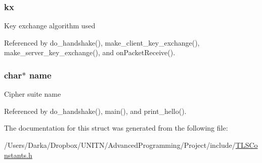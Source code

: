 \subsubsection[{\texorpdfstring{kx}{kx}}]{ kx}\hypertarget{structcipher__suite__t_ad84bfc73673c813712dbbc08d89c53a9}{}\label{structcipher__suite__t_ad84bfc73673c813712dbbc08d89c53a9}
Key exchange algorithm used 

Referenced by do\+\_\+handshake(), make\+\_\+client\+\_\+key\+\_\+exchange(), make\+\_\+server\+\_\+key\+\_\+exchange(), and on\+Packet\+Receive().

\subsubsection[{\texorpdfstring{name}{name}}]{\setlength{\rightskip}{0pt plus 5cm}char$\ast$ name}\hypertarget{structcipher__suite__t_a5ac083a645d964373f022d03df4849c8}{}\label{structcipher__suite__t_a5ac083a645d964373f022d03df4849c8}
Cipher suite name 

Referenced by do\+\_\+handshake(), main(), and print\+\_\+hello().



The documentation for this struct was generated from the following file\+:\begin{DoxyCompactItemize}
\item 
/\+Users/\+Darka/\+Dropbox/\+U\+N\+I\+T\+N/\+Advanced\+Programming/\+Project/include/\hyperlink{_t_l_s_constants_8h}{T\+L\+S\+Constants.\+h}\end{DoxyCompactItemize}

